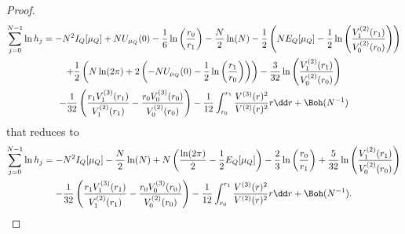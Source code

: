 \begin{proof}
\begin{multline}
			\sum_{j=0}^{N-1} \ln{h_j} = - N^2 I_Q[\mu_Q] + N U_{\mu_Q}(0) - \frac{1}{6} \ln{\left( \frac{r_0}{r_1}\right)}  - \frac{N}{2} \ln(N) - \frac{1}{2}  \left( N E_Q[\mu_Q] -  \frac{1}{2} \ln \left( \frac{V^{(2)}_{1}(r_1)}{V^{(2)}_{0}(r_{0})} \right) \right)	\\ + \frac{1}{2} \left( N \ln(2\pi) + 2 \left( - N U_{\mu_Q}(0) - \frac{1}{2} \ln\left(\frac{r_1}{r_0}\right) \right) \right)
		 	- \frac{3}{32} \ln\left( \frac{V^{(2)}_1(r_1)}{V^{(2)}_0(r_0)} \right) \\ - \frac{1}{32} \left( \frac{r_1  V^{(3)}_1(r_1)}{V^{(2)}_1(r_1)} - \frac{r_0 V^{(3)}_0(r_0)}{V^{(2)}_0(r_0)}\right) - \frac{1}{12} \int_{r_0}^{r_1} \frac{V^{(3)}(r)^2}{V^{(2)}(r)^{2}} r \dd r +  \Boh(N^{-1})
	\end{multline}
	that reduces to
	\begin{multline}
		\sum_{j=0}^{N-1} \ln{h_j} = - N^2 I_Q[\mu_Q] - \frac{N}{2} \ln(N) + N \left(\frac{\ln(2\pi)}{2} - \frac{1}{2} E_Q[\mu_Q]\right) - \frac{2}{3}  \ln{\left( \frac{r_0}{r_1}\right)}  + \frac{5}{32} \ln \left( \frac{V^{(2)}_{1}(r_1)}{V^{(2)}_{0}(r_{0})} \right) \\ - \frac{1}{32} \left( \frac{r_1  V^{(3)}_1(r_1)}{V^{(2)}_1(r_1)} - \frac{r_0 V^{(3)}_0(r_0)}{V^{(2)}_0(r_0)}\right) - \frac{1}{12} \int_{r_0}^{r_1} \frac{V^{(3)}(r)^2}{V^{(2)}(r)^{2}} r \dd r +  \Boh(N^{-1}).
	\end{multline}
\end{proof}


